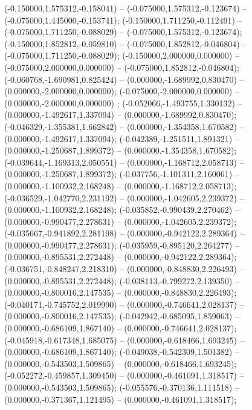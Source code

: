  (-0.150000,1.575312,-0.158041) -- (-0.075000,1.575312,-0.123674) -- (-0.075000,1.445000,-0.153741);
 (-0.150000,1.711250,-0.112491) -- (-0.075000,1.711250,-0.088029) -- (-0.075000,1.575312,-0.123674);
 (-0.150000,1.852812,-0.059810) -- (-0.075000,1.852812,-0.046804) -- (-0.075000,1.711250,-0.088029);
 (-0.150000,2.000000,0.000000) -- (-0.075000,2.000000,0.000000) -- (-0.075000,1.852812,-0.046804);
 (-0.060768,-1.690981,0.825424) -- (0.000000,-1.689992,0.830470) -- (0.000000,-2.000000,0.000000);
 (-0.075000,-2.000000,0.000000) -- (0.000000,-2.000000,0.000000) ;
 (-0.052066,-1.493755,1.330132) -- (0.000000,-1.492617,1.337094) -- (0.000000,-1.689992,0.830470);
 (-0.046329,-1.355381,1.662842) -- (0.000000,-1.354358,1.670582) -- (0.000000,-1.492617,1.337094);
 (-0.042389,-1.251511,1.891321) -- (0.000000,-1.250687,1.899372) -- (0.000000,-1.354358,1.670582);
 (-0.039644,-1.169313,2.050551) -- (0.000000,-1.168712,2.058713) -- (0.000000,-1.250687,1.899372);
 (-0.037756,-1.101311,2.160061) -- (0.000000,-1.100932,2.168248) -- (0.000000,-1.168712,2.058713);
 (-0.036529,-1.042770,2.231192) -- (0.000000,-1.042605,2.239372) -- (0.000000,-1.100932,2.168248);
 (-0.035852,-0.990439,2.270462) -- (0.000000,-0.990477,2.278631) -- (0.000000,-1.042605,2.239372);
 (-0.035667,-0.941892,2.281198) -- (0.000000,-0.942122,2.289364) -- (0.000000,-0.990477,2.278631);
 (-0.035959,-0.895120,2.264277) -- (0.000000,-0.895531,2.272448) -- (0.000000,-0.942122,2.289364);
 (-0.036751,-0.848247,2.218310) -- (0.000000,-0.848830,2.226493) -- (0.000000,-0.895531,2.272448);
 (-0.038113,-0.799272,2.139350) -- (0.000000,-0.800016,2.147535) -- (0.000000,-0.848830,2.226493);
 (-0.040171,-0.745752,2.019990) -- (0.000000,-0.746641,2.028137) -- (0.000000,-0.800016,2.147535);
 (-0.042942,-0.685095,1.859063) -- (0.000000,-0.686109,1.867140) -- (0.000000,-0.746641,2.028137);
 (-0.045918,-0.617348,1.685075) -- (0.000000,-0.618466,1.693245) -- (0.000000,-0.686109,1.867140);
 (-0.049038,-0.542309,1.501382) -- (0.000000,-0.543503,1.509865) -- (0.000000,-0.618466,1.693245);
 (-0.052272,-0.459857,1.309450) -- (0.000000,-0.461091,1.318517) -- (0.000000,-0.543503,1.509865);
 (-0.055576,-0.370136,1.111518) -- (0.000000,-0.371367,1.121495) -- (0.000000,-0.461091,1.318517);
